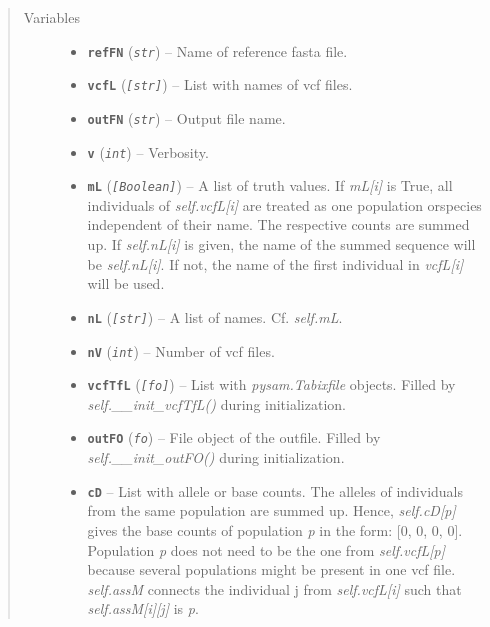 \documentclass[letterpaper,10pt,english]{sphinxmanual}
\begin{document}
\begin{fulllineitems}
\begin{quote}
\begin{description}
\begin{itemize}
\end{itemize}

\item[{Variables}] \leavevmode\begin{itemize}
\item {} 
\textbf{\texttt{refFN}} (\emph{\texttt{str}}) -- Name of reference fasta file.

\item {} 
\textbf{\texttt{vcfL}} (\emph{\texttt{{[}str{]}}}) -- List with names of vcf files.

\item {} 
\textbf{\texttt{outFN}} (\emph{\texttt{str}}) -- Output file name.

\item {} 
\textbf{\texttt{v}} (\emph{\texttt{int}}) -- Verbosity.

\item {} 
\textbf{\texttt{mL}} (\emph{\texttt{{[}Boolean{]}}}) -- A list of truth values.  If \emph{mL{[}i{]}} is True,
all individuals of \emph{self.vcfL{[}i{]}} are treated as one
population orspecies independent of their name.  The
respective counts are summed up.  If \emph{self.nL{[}i{]}} is given,
the name of the summed sequence will be \emph{self.nL{[}i{]}}.  If not,
the name of the first individual in \emph{vcfL{[}i{]}} will be used.

\item {} 
\textbf{\texttt{nL}} (\emph{\texttt{{[}str{]}}}) -- A list of names. Cf. \emph{self.mL}.

\item {} 
\textbf{\texttt{nV}} (\emph{\texttt{int}}) -- Number of vcf files.

\item {} 
\textbf{\texttt{vcfTfL}} (\emph{\texttt{{[}fo{]}}}) -- List with \emph{pysam.Tabixfile} objects. Filled by
\emph{self.\_\_init\_vcfTfL()} during initialization.

\item {} 
\textbf{\texttt{outFO}} (\emph{\texttt{fo}}) -- File object of the outfile. Filled by
\emph{self.\_\_init\_outFO()} during initialization.

\item {} 
\textbf{\texttt{cD}} -- List with allele or base counts. The alleles of
individuals from the same population are summed up.  Hence,
\emph{self.cD{[}p{]}} gives the base counts of population \emph{p} in the
form: {[}0, 0, 0, 0{]}.  Population \emph{p} does not need to be the
one from \emph{self.vcfL{[}p{]}} because several populations might be
present in one vcf file.  \emph{self.assM} connects the individual
j from \emph{self.vcfL{[}i{]}} such that \emph{self.assM{[}i{]}{[}j{]}} is \emph{p}.


\end{itemize}
\end{description}
\end{quote}
\end{fulllineitems}
\end{document}
